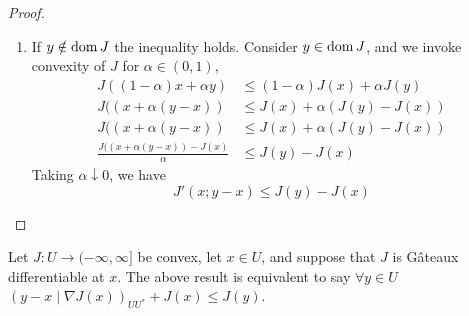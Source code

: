 \begin{proposition}
\begin{proof}
\begin{enumerate}
	 \item If $y \notin \mathrm{dom\,} J$ the inequality holds. Consider $y \in \mathrm{dom\,} J$, and we invoke convexity of $J$ for $\alpha \in (0,1)$, 
	 \begin{align*}
		 J((1-\alpha) x+\alpha y) &\leq (1-\alpha)J(x)+\alpha J(y) \\
		 J((x+\alpha (y-x)) &\leq J(x)+\alpha (J(y)-J(x)) \\
		 J((x+\alpha (y-x)) &\leq J(x)+\alpha (J(y)-J(x)) \\
		 \frac{J((x+\alpha (y-x)) - J(x)}{\alpha} &\leq J(y)-J(x)
	 \end{align*}
	 Taking $\alpha \downarrow 0$, we have
	 \begin{equation*}
	 	J'(x;y-x)\leq J(y)-J(x)
	 \end{equation*}
\end{enumerate}
 \end{proof}
\end{proposition}

\begin{remark}
	Let $J: U \rightarrow (-\infty, \infty]$ be convex, let $x\in U$, and suppose
	that $J$ is G\^ateaux differentiable at $x$. The above result is equivalent to  say $\forall y \in U$ $(y - x \mid \nabla J(x))_{UU^*}+J(x) \leq J(y)$.
\end{remark}	

